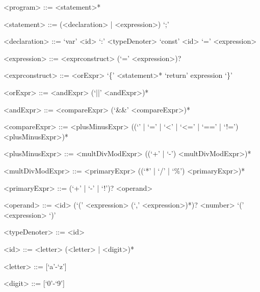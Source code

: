\setlength{\grammarparsep}{10pt plus 1pt minus 1pt} %
\setlength{\grammarindent}{12em} %
\begin{grammar}

<program>			::= <statement>*

<statement>			::= (<declaration> | <expression>) `;'

<declaration>		::= `var' <id> `:' <typeDenoter>
\alt					`const' <id> `=' <expression>

<expression>		::= <exprconstruct> (`=' <expression>)?

<exprconstruct>		::= <orExpr>
\alt					`\{' <statement>* `return' expression `\}'

<orExpr>			::=	<andExpr> (`||' <andExpr>)*

<andExpr>			::= <compareExpr> (`&&' <compareExpr>)*

<compareExpr>		::= <plusMinusExpr> ((`\>' | `\>=' | `<' | `<=' | `==' | `!=') <plusMinusExpr>)*

<plusMinusExpr>		::= <multDivModExpr> ((`+' | `-') <multDivModExpr>)*

<multDivModExpr>	::= <primaryExpr> ((`*' | `/' | `\%') <primaryExpr>)*

<primaryExpr>		::= (`+' | `-' | `!')? <operand>

<operand>			::= <id> (`(' <expression> (`,' <expression>)*)?
\alt					<number>
\alt					`(' <expression> `)'

<typeDenoter>		::= <id>

<id>				::= <letter> (<letter> | <digit>)*

<letter>			::= [`a'-`z'] 
\alt					[`A'-`Z']

<digit>				::= [`0'-`9']

\end{grammar}